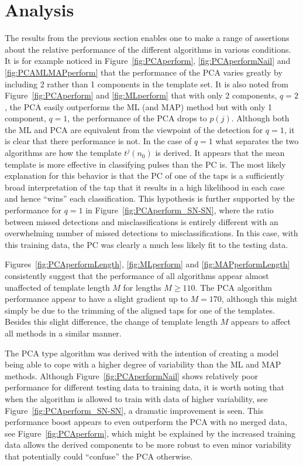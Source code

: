 \section{Analysis}
The results from the previous section enables one to make a range of assertions about the relative performance of the different algorithms in various conditions. It is for example noticed in Figure~\ref{fig:PCAperform}, \ref{fig:PCAperformNail} and \ref{fig:PCAMLMAPperform} that the performance of the PCA varies greatly by including 2 rather than 1 components in the template set. It is also noted from Figure~\ref{fig:PCAperform} and \ref{fig:MLperform} that with only 2 components, $q=2$, the PCA easily outperforms the ML (and MAP) method but with only 1 component, $q=1$, the performance of the PCA drops to $p(j)$. Although both the ML and PCA are equivalent from the viewpoint of the detection for $q=1$, it is clear that there performance is not. In the case of $q=1$ what separates the two algorithms are how the template $t^j(n_0)$ is derived. It appears that the mean template is more effective in classifying pulses than the PC is. The most likely explanation for this behavior is that the PC of one of the taps is a sufficiently broad interpretation of the tap that it results in a high likelihood in each case and hence ``wins'' each classification. This hypothesis is further supported by the performance for $q=1$ in Figure~\ref{fig:PCAperform_SN-SN}, where the ratio between missed detections and misclassifications is entirely different with an overwhelming number of missed detections to misclassifications. In this case, with this training data, the PC was clearly a much less likely fit to the testing data.

Figures~\ref{fig:PCAperformLength}, \ref{fig:MLperform} and \ref{fig:MAPperformLength} consistently suggest that the performance of all algorithms appear almost unaffected of template length $M$ for lengths $M\geq110$. The PCA algorithm performance appear to have a slight gradient up to $M=170$, although this might simply be due to the trimming of the aligned taps for one of the templates. Besides this slight difference, the change of template length $M$ appears to affect all methods in a similar manner.

The PCA type algorithm was derived with the intention of creating a model being able to cope with a higher degree of variability than the ML and MAP methods. Although Figure~\ref{fig:PCAperformNail} shows relatively poor performance for different testing data to training data, it is worth noting that when the algorithm is allowed to train with data of higher variability, see Figure~\ref{fig:PCAperform_SN-SN}, a dramatic improvement is seen. This performance boost appears to even outperform the PCA with no merged data, see Figure~\ref{fig:PCAperform}, which might be explained by the increased training data allows the derived components to be more robust to even minor variability that potentially could ``confuse'' the PCA otherwise.

